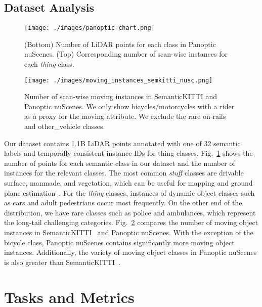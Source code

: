 \documentclass[letterpaper, 10 pt, journal, twoside]{IEEEtran}
\newcommand{\figref}[1]{Fig.~\ref{#1}}
\begin{document}
\vspace{-2mm}
\subsection{Dataset Analysis}

\begin{figure}
\centering
\texttt{[image: ./images/panoptic-chart.png]}
\caption{(Bottom) Number of LiDAR points for each class in Panoptic nuScenes. 
(Top) Corresponding number of scan-wise instances for each \emph{thing} class.}
\label{fig:panoptic_chart}
\vspace{-0.2cm}
\end{figure}

\begin{figure}
\centering
\texttt{[image: ./images/moving\_instances\_semkitti\_nusc.png]}
\caption{Number of scan-wise moving instances in SemanticKITTI and Panoptic nuScenes. 
We only show bicycles/motorcycles with a rider as a proxy for the moving attribute. We exclude the rare on-rails and other\_vehicle classes.}
\label{fig:moving_instances_semkitti_nusc}
\vspace{-0.2cm}
\end{figure}

Our dataset contains 1.1B LiDAR points annotated with one of 32 semantic labels and temporally consistent instance IDs for thing classes. \figref{fig:panoptic_chart} shows the number of points for each semantic class in our dataset and the number of instances for the relevant classes. The most common \emph{stuff} classes are drivable surface, manmade, and vegetation, which can be useful for mapping and ground plane estimation~\cite{cattaneo2021lcdnet}. For the \emph{thing} classes, instances of dynamic object classes such as cars and adult pedestrians occur most frequently. On the other end of the distribution, we have rare classes such as police and ambulances, which represent the long-tail challenging categories. \figref{fig:moving_instances_semkitti_nusc} compares the number of moving object instances in SemanticKITTI~\cite{behley2021panoptickitti} and Panoptic nuScenes. 
With the exception of the bicycle class, Panoptic nuScenes contains significantly more moving object instances. Additionally, the variety of moving object classes in Panoptic nuScenes is also greater than SemanticKITTI~\cite{behley2021panoptickitti}. 
\section{Tasks and Metrics}
\label{sec:tasks_metrics}
\end{document}
